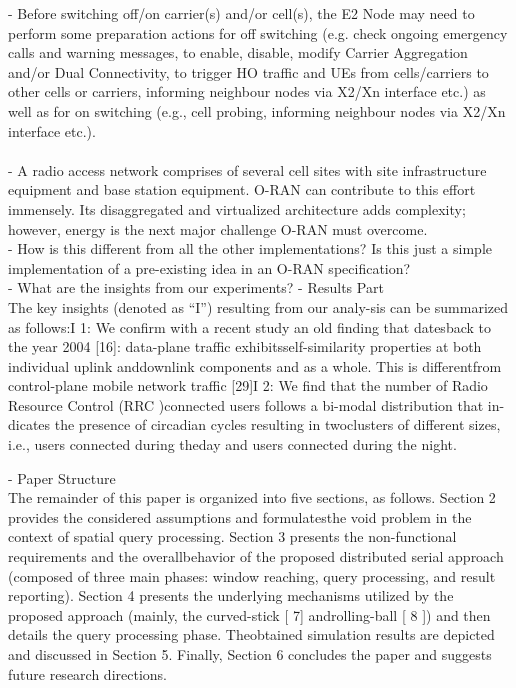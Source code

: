 \documentclass[conference]{IEEEtran}
\begin{document}
- Before switching off/on carrier(s) and/or cell(s), the E2 Node may need to perform some preparation actions for off switching (e.g. check ongoing emergency calls and warning messages, to enable, disable, modify Carrier Aggregation and/or Dual Connectivity, to trigger HO traffic and UEs from cells/carriers to other cells or carriers, informing neighbour nodes via X2/Xn interface etc.) as well as for on switching (e.g., cell probing, informing neighbour nodes via X2/Xn interface etc.). \\\\
- A radio access network comprises of several cell sites with site infrastructure equipment and base station equipment. O-RAN can contribute to this effort immensely. Its disaggregated and virtualized architecture adds complexity; however, energy is the next major challenge O-RAN must overcome. \\

- How is this different from all the other implementations? Is this just a simple implementation of a pre-existing idea in an O-RAN specification?\\
- What are the insights from our experiments? - Results Part \\
The key insights (denoted as “I”) resulting from our analy-sis can be summarized as follows:I 1: We confirm with a recent study an old finding that datesback to the year 2004 [16]: data-plane traffic exhibitsself-similarity properties at both individual uplink anddownlink components and as a whole. This is differentfrom control-plane mobile network traffic [29]I 2: We find that the number of Radio Resource Control (RRC )connected users follows a bi-modal distribution that in-dicates the presence of circadian cycles resulting in twoclusters of different sizes, i.e., users connected during theday and users connected during the night.

- Paper Structure \\
The remainder of this paper is organized into five sections, as follows. Section 2 provides the considered assumptions and formulatesthe void problem in the context of spatial query processing. Section 3 presents the non-functional requirements and the overallbehavior of the proposed distributed serial approach (composed of three main phases: window reaching, query processing, and result reporting). Section 4 presents the underlying mechanisms utilized by the proposed approach (mainly, the curved-stick [ 7] androlling-ball [ 8 ]) and then details the query processing phase. Theobtained simulation results are depicted and discussed in Section 5. Finally, Section 6 concludes the paper and suggests future research directions.
\end{document}
